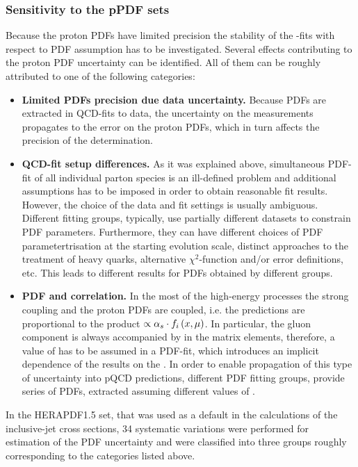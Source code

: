 \subsubsection{Sensitivity to the pPDF sets}
\label{subsec:aspdfassump}
Because the proton PDFs have limited precision the stability of the \asz-fits with respect to PDF assumption has to be investigated. Several effects contributing to the proton PDF uncertainty can be identified. All of them can be roughly attributed to one of the following categories:
\begin{itemize}
 \item \textbf{Limited PDFs precision due data uncertainty.} Because PDFs are extracted in QCD-fits to data, the uncertainty on the measurements propagates to the error on the proton PDFs, which in turn affects the precision of the \asz determination.
 \item \textbf{QCD-fit setup differences.} As it was explained above, simultaneous PDF-fit of all individual parton species is an ill-defined problem and additional assumptions has to be imposed in order to obtain reasonable fit results. However, the choice of the data and fit settings is usually ambiguous. Different fitting groups, typically, use partially different datasets to constrain PDF parameters. Furthermore, they can have different choices of PDF parametertrisation at the starting evolution scale, distinct approaches to the treatment of heavy quarks, alternative $\chi^2$-function and/or error definitions, etc. This leads to different results for PDFs obtained by different groups.
 \item \textbf{PDF and \asz correlation.} In the most of the high-energy processes the strong coupling and the proton PDFs are coupled, i.e. the predictions are proportional to the product $\propto \mbox{$\alpha_{s}$}\cdot f_i\left(x,\mu\right)$. In particular, the gluon component is always accompanied by \as in the matrix elements, therefore, a value of \asz has to be assumed in a PDF-fit, which introduces an implicit dependence of the results on the \asz. In order to enable propagation of this type of uncertainty into pQCD predictions, different PDF fitting groups, provide series of PDFs, extracted assuming different values of \asz.
\end{itemize}

In the HERAPDF1.5 set, that was used as a default in the calculations of the inclusive-jet cross sections, 34 systematic variations were performed for estimation of the PDF uncertainty and were classified into three groups roughly corresponding to the categories listed above. 

